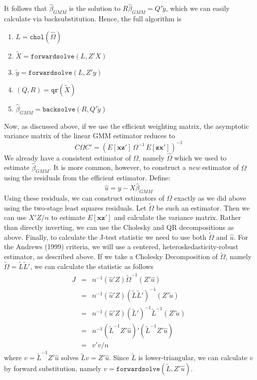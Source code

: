 \documentclass[12pt]{article}
\theoremstyle{definition}
\begin{document}
It follows that $\widehat{\beta}_{GMM}$ is the solution to $R\widehat{\beta}_{GMM} = Q'\widetilde{y}$, which we can easily calculate via backsubstitution. Hence, the full algorithm is
  \begin{enumerate}
    \item $L = \texttt{chol}(\widehat{\Omega})$ 
    \item $\widetilde{X} = \texttt{forwardsolve}(L, Z'X)$
    \item $\widetilde{y} = \texttt{forwardsolve}(L, Z'y)$
    \item $(Q, R) = \texttt{qr}(\widetilde{X})$
    \item $\widehat{\beta}_{GMM} = \texttt{backsolve}(R, Q'\widetilde{y})$
  \end{enumerate}
Now, as discussed above, if we use the efficient weighting matrix, the asymptotic variance matrix of the linear GMM estimator reduces to
  $$C\Omega C' =\left( E[\mathbf{x}\mathbf{z}']\, \Omega^{-1} \,E[\mathbf{z}\mathbf{x}'] \right)^{-1}$$
We already have a consistent estimator of $\Omega$, namely $\widehat{\Omega}$ which we used to estimate $\widehat{\beta}_{GMM}$. It is more common, however, to construct a \emph{new} estimator of $\Omega$ using the residuals from the efficient estimator. Define:
  $$\widehat{u} = y - X\widehat{\beta}_{GMM}$$
Using these residuals, we can construct estimators of $\Omega$ exactly as we did above using the two-stage least squares residuals. Let $\widetilde{\Omega}$ be such an estimator. Then we can use $X'Z/n$ to estimate $E[\mathbf{x}\mathbf{z}']$ and calculate the variance matrix. Rather than directly inverting, we can use the Cholesky and QR decompositions as above. Finally, to calculate the J-test statistic we need to use both $\widetilde{\Omega}$ and $\widehat{u}$. For the Andrews (1999) criteria, we will use a centered, heteroskedasticity-robust estimator, as described above. If we take a Cholesky Decomposition of $\widetilde{\Omega}$, namely $\widetilde{\Omega} = \widetilde{L}\widetilde{L}'$, we can calculate the statistic as follows
  \begin{eqnarray*}
    J &=& n^{-1} (\widehat{u}'Z) \widetilde{\Omega}^{-1}(Z' \widehat{u})\\
      &=& n^{-1} (\widehat{u}'Z) \left(\widetilde{L}\widetilde{L}'\right)^{-1}(Z'\widetilde{u})\\
      &=& n^{-1} (\widehat{u}'Z) (\widetilde{L}')^{-1}\widetilde{L}^{-1}(Z'\widetilde{u})\\
      &=& n^{-1} \left(\widetilde{L}^{-1}Z' \widehat{u} \right)'\left(\widetilde{L}^{-1}Z' \widehat{u} \right)\\
      &=& v'v/n
  \end{eqnarray*}
where $v=\widetilde{L}^{-1}Z' \widehat{u}$ solves $\widetilde{L}v = Z'\widehat{u}$. Since $\widetilde{L}$ is lower-triangular, we can calculate $v$ by forward substitution, namely $v = \texttt{forwardsolve}(\widetilde{L}, Z'\widehat{u})$. 
\end{document}
